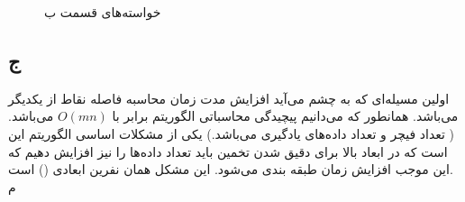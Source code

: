 \documentclass[12pt,onecolumn,a4paper]{article}
\begin{document}
\begin{figure}[h!]
    \centering
    \caption{خواسته‌های قسمت ب}
    \label{fig:10}
\end{figure}

\subsection*{ج}
اولین مسيله‌ای که به چشم می‌آید افزایش مدت زمان محاسبه فاصله نقاط از یکدیگر می‌باشد. همانطور که می‌دانیم پیچیدگی محاسباتی الگوریتم  برابر با $O(mn)$ می‌باشد. ( تعداد فیچر و  تعداد داده‌های یادگیری می‌باشد.) یکی از مشکلات اساسی الگوریتم  این است که در ابعاد بالا برای دقیق شدن تخمین باید تعداد داده‌ها را نیز افزایش دهیم که این موجب افزایش زمان طبقه بندی می‌شود. این مشکل همان نفرین ابعادی () است.
\\
م
\end{document}
